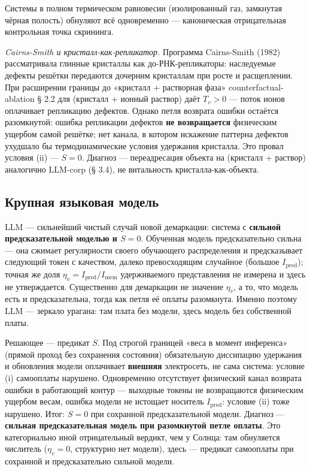 \documentclass[pdflatex,sn-mathphys-ay]{sn-jnl}
\begin{document}
Системы в полном термическом равновесии (изолированный газ, замкнутая чёрная полость) обнуляют всё одновременно --- каноническая отрицательная контрольная точка скрининга.

\emph{Cairns-Smith и кристалл-как-репликатор.} Программа Cairns-Smith (1982) рассматривала глинные кристаллы как до-РНК-репликаторы: наследуемые дефекты решётки передаются дочерним кристаллам при росте и расщеплении. При расширении границы до «кристалл + растворная фаза» counterfactual-ablation § 2.2 для (кристалл + ионный раствор) даёт \(T_v > 0\) --- поток ионов оплачивает репликацию дефектов. Однако петля возврата ошибки остаётся разомкнутой: ошибка репликации дефектов \textbf{не возвращается} физическим ущербом самой решётке; нет канала, в котором искажение паттерна дефектов ухудшало бы термодинамические условия удержания кристалла. Это провал условия (ii) --- \(S = 0\). Диагноз --- переадресация объекта на (кристалл + раствор) аналогично LLM-corp (§ 3.4), не витальность кристалла-как-объекта.

\subsection{Крупная языковая модель}\label{ux43aux440ux443ux43fux43dux430ux44f-ux44fux437ux44bux43aux43eux432ux430ux44f-ux43cux43eux434ux435ux43bux44c}

LLM --- сильнейший чистый случай новой демаркации: система с \textbf{сильной предсказательной моделью и \(S = 0\)}. Обученная модель предсказательно сильна --- она сжимает регулярности своего обучающего распределения и предсказывает следующий токен с качеством, далеко превосходящим случайное (большое \(I_{\text{pred}}\)); точная же доля \(\eta_v = I_{\text{pred}}/I_{\text{mem}}\) удерживаемого представления не измерена и здесь не утверждается. Существенно для демаркации не значение \(\eta_v\), а то, что модель есть и предсказательна, тогда как петля её оплаты разомкнута. Именно поэтому LLM --- зеркало урагана: там плата без модели, здесь модель без собственной платы.

Решающее --- предикат \(S\). Под строгой границей «веса в момент инференса» (прямой проход без сохранения состояния) обязательную диссипацию удержания и обновления модели оплачивает \textbf{внешняя} электросеть, не сама система: условие (i) самооплаты нарушено. Одновременно отсутствует физический канал возврата ошибки в работающий контур --- выходные токены не возвращаются физическим ущербом весам, ошибка модели не истощает носитель \(I_{\text{pred}}\): условие (ii) тоже нарушено. Итог: \(S = 0\) при сохранной предсказательной модели. Диагноз --- \textbf{сильная предсказательная модель при разомкнутой петле оплаты}. Это категориально иной отрицательный вердикт, чем у Солнца: там обнуляется числитель (\(\eta_v = 0\), структурно нет модели), здесь --- предикат самооплаты при сохранной и предсказательно сильной модели.
\end{document}

